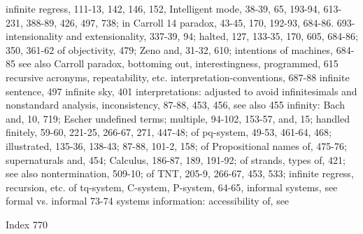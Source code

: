 infinite regress, 111-13, 142, 146, 152,         Intelligent mode, 38-39, 65, 193-94, 613-
231, 388-89, 426, 497, 738; in Carroll           14
paradox, 43-45, 170, 192-93, 684-86. 693-        intensionality and extensionality, 337-39,
94; halted, 127, 133-35, 170, 605, 684-86;       350, 361-62
of objectivity, 479; Zeno and, 31-32, 610;       intentions of machines, 684-85
see also Carroll paradox, bottoming out,         interestingness, programmed, 615
recursive acronyms, repeatability, etc.          interpretation-conventions, 687-88
infinite sentence, 497 infinite sky, 401         interpretations:     adjusted       to     avoid
infinitesimals and nonstandard analysis,         inconsistency, 87-88, 453, 456, see also
455 infinity: Bach and, 10, 719; Escher          undefined terms; multiple, 94-102, 153-57,
and, 15; handled finitely, 59-60, 221-25,        266-67, 271, 447-48; of pq-system, 49-53,
461-64, 468; illustrated, 135-36, 138-43;        87-88, 101-2, 158; of Propositional
names of, 475-76; supernaturals and, 454;        Calculus, 186-87, 189, 191-92; of strands,
types of, 421; see also nontermination,          509-10; of TNT, 205-9, 266-67, 453, 533;
infinite regress, recursion, etc.                of tq-system, C-system, P-system, 64-65,
informal systems, see formal vs. informal        73-74
systems information: accessibility of, see



Index                                                                                        770

